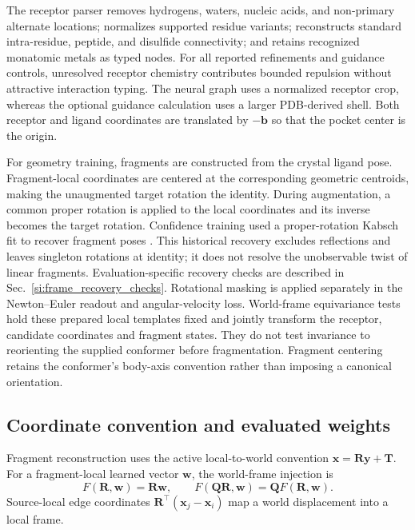 \documentclass{article}
\newcommand{\citep}[1]{\cite{#1}}
\begin{document}
The receptor parser removes hydrogens, waters, nucleic acids, and non-primary alternate locations; normalizes supported residue variants; reconstructs standard intra-residue, peptide, and disulfide connectivity; and retains recognized monatomic metals as typed nodes.
For all reported refinements and guidance controls, unresolved receptor chemistry contributes bounded repulsion without attractive interaction typing.
The neural graph uses a normalized receptor crop, whereas the optional guidance calculation uses a larger PDB-derived shell.
Both receptor and ligand coordinates are translated by $-\mathbf{b}$ so that the pocket center is the origin.

For geometry training, fragments are constructed from the crystal ligand pose.
Fragment-local coordinates are centered at the corresponding geometric centroids, making the unaugmented target rotation the identity.
During augmentation, a common proper rotation is applied to the local coordinates and its inverse becomes the target rotation.
Confidence training used a proper-rotation Kabsch fit to recover fragment poses \citep{kabsch1976rotation}. This historical recovery excludes reflections and leaves singleton rotations at identity; it does not resolve the unobservable twist of linear fragments. Evaluation-specific recovery checks are described in Sec.~\ref{si:frame_recovery_checks}. Rotational masking is applied separately in the Newton--Euler readout and angular-velocity loss.
World-frame equivariance tests hold these prepared local templates fixed and jointly transform the receptor, candidate coordinates and fragment states. They do not test invariance to reorienting the supplied conformer before fragmentation. Fragment centering retains the conformer's body-axis convention rather than imposing a canonical orientation.

\subsection{Coordinate convention and evaluated weights}
\label{si:orientation_convention}

Fragment reconstruction uses the active local-to-world convention \(\mathbf x=\mathbf R\mathbf y+\mathbf T\).
For a fragment-local learned vector \(\mathbf w\), the world-frame injection is
\begin{equation}
    F(\mathbf R,\mathbf w)=\mathbf R\mathbf w,
    \qquad
    F(\mathbf Q\mathbf R,\mathbf w)=\mathbf QF(\mathbf R,\mathbf w).
    \label{eq:si_orientation_injection}
\end{equation}
Source-local edge coordinates \(\mathbf R^\top(\mathbf x_j-\mathbf x_i)\) map a world displacement into a local frame.
\end{document}
